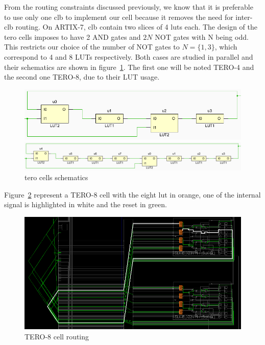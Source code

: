 From the routing constraints discussed previously, we know that it is preferable to use only one \acrshort{clb} to implement our cell because it removes the need for inter-\acrshort{clb} routing. On ARTIX-7, \acrshort{clb} contain two slices of 4 \acrshort{lut}s each. The design of the \acrshort{tero} cells imposes to have 2 AND gates and $2 N$ NOT gates with N being odd. This restricts our choice of the number of NOT gates to $N = \{1, 3\}$, which correspond to 4 and 8 LUTs respectively. Both cases are studied in parallel and their schematics are shown in figure~\ref{fig:tero_cell_4_&_8_diagram}. The first one will be noted TERO-4 and the second one TERO-8, due to their LUT usage.

\begin{figure}[H]
   \begin{minipage}[b]{\linewidth} 
        \centering
        \includegraphics[width=\linewidth]{images/tero_4_schematic.png}
   \end{minipage}
   \begin{minipage}[b]{\linewidth}   
        \centering
        \includegraphics[width=\linewidth]{images/tero_8_schematic.png}
   \end{minipage}
   \caption{\label{fig:tero_cell_4_&_8_diagram}\acrshort{tero} cells schematics}
\end{figure}

Figure~\ref{fig:tero_8_cell_routing} represent a TERO-8 cell with the eight \acrshort{lut} in orange,  one of the internal signal is highlighted in white and the reset in green.

\begin{figure}[H]
    \centering \includegraphics[width=0.9\linewidth]{images/cell_routing.png}
    \caption{TERO-8 cell routing}
    \label{fig:tero_8_cell_routing}
\end{figure}

